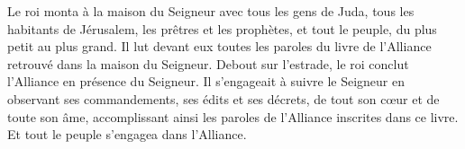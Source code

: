 Le roi monta à la maison du Seigneur avec tous les gens de Juda,
	tous les habitants de Jérusalem, les prêtres et les prophètes,
	et tout le peuple, du plus petit au plus grand.
Il lut devant eux toutes les paroles du livre de l’Alliance
		retrouvé dans la maison du Seigneur.
Debout sur l’estrade, le roi conclut l’Alliance en présence du Seigneur.
Il s’engageait à suivre le Seigneur
	en observant ses commandements, ses édits et ses décrets,
	de tout son cœur et de toute son âme,
	accomplissant ainsi les paroles de l’Alliance inscrites dans ce livre.
Et tout le peuple s’engagea dans l’Alliance.
